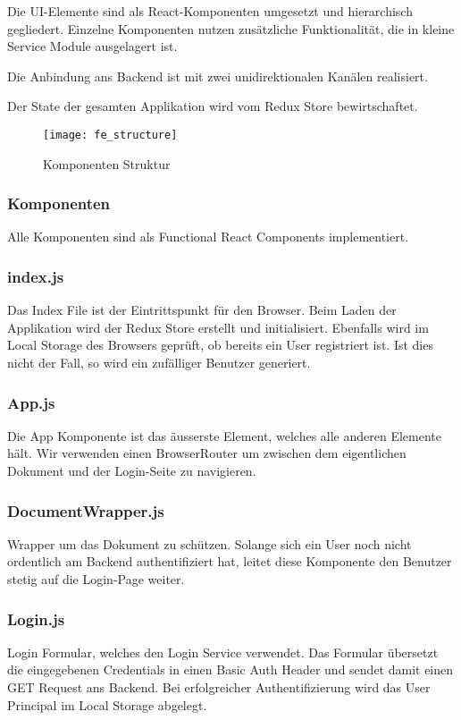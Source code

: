 Die UI-Elemente sind als React-Komponenten umgesetzt und hierarchisch gegliedert.
Einzelne Komponenten nutzen zusätzliche Funktionalität, die in kleine Service Module ausgelagert ist.

Die Anbindung ans Backend ist mit zwei unidirektionalen Kanälen realisiert.

Der State der gesamten Applikation wird vom Redux Store bewirtschaftet.

\begin{figure}[H]
    \centering
    \texttt{[image: fe\_structure]}
    \caption{Komponenten Struktur}
    \label{fig: Fe_Structure}
\end{figure}

\subsubsection{Komponenten}

Alle Komponenten sind als Functional React Components implementiert.

\subsubsection*{index.js}
Das Index File ist der Eintrittspunkt für den Browser.
Beim Laden der Applikation wird der Redux Store erstellt und initialisiert.
Ebenfalls wird im Local Storage des Browsers geprüft, ob bereits ein User registriert ist.
Ist dies nicht der Fall, so wird ein zufälliger Benutzer generiert.

\subsubsection*{App.js}
Die App Komponente ist das äusserste Element, welches alle anderen Elemente hält.
Wir verwenden einen BrowserRouter um zwischen dem eigentlichen Dokument und der Login-Seite zu navigieren.

\subsubsection*{DocumentWrapper.js}
Wrapper um das Dokument zu schützen.
Solange sich ein User noch nicht ordentlich am Backend authentifiziert hat, leitet diese Komponente den Benutzer stetig auf die Login-Page weiter.

\subsubsection*{Login.js}
Login Formular, welches den Login Service verwendet.
Das Formular übersetzt die eingegebenen Credentials in einen Basic Auth Header und sendet damit einen GET Request ans Backend.
Bei erfolgreicher Authentifizierung wird das User Principal im Local Storage abgelegt.

